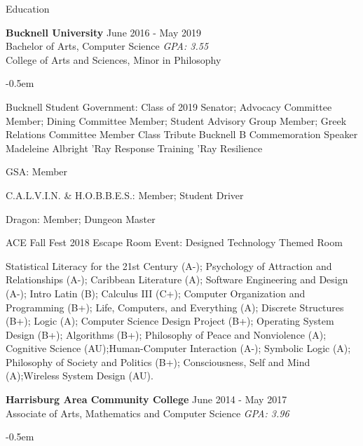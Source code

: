\documentclass{resume} %
\begin{document}

\begin{rSection}{Education}

{\bf Bucknell University} {June 2016 - May 2019} 
\\ Bachelor of Arts, Computer Science  {\em GPA: 3.55}
\\ College of Arts and Sciences, Minor in Philosophy 
\begin{rSubSection}{}{
   \itemsep -0.5em \vspace{-0.5em} %
 
    \item {Bucknell Student Government:} Class of 2019 Senator; Advocacy Committee Member; Dining Committee Member; Student Advisory Group Member; Greek Relations Committee Member
    \subitem Class Tribute Bucknell B 
    \subitem Commemoration Speaker Madeleine Albright
    \subitem 'Ray Response Training
    \subitem 'Ray Resilience
    \item {GSA:} Member
    \item {C.A.L.V.I.N. \& H.O.B.B.E.S.:} Member; Student Driver
    \item {Dragon:} Member; Dungeon Master
    \item {ACE} 
    \subitem Fall Fest 2018
     Escape Room Event: Designed Technology Themed Room}
    
  \end{rSubSection}
Statistical Literacy for the 21st Century (A-); Psychology of Attraction and Relationships (A-); Caribbean Literature (A); Software Engineering and Design (A-); Intro Latin (B); Calculus III (C+); Computer Organization and Programming (B+); Life, Computers, and Everything (A); Discrete Structures (B+); Logic (A); Computer Science Design Project (B+); Operating System Design (B+); Algorithms (B+); Philosophy of Peace and Nonviolence (A); Cognitive Science (AU);Human-Computer Interaction (A-); Symbolic Logic (A); Philosophy of Society and Politics (B+); Consciousness, Self and Mind (A);Wireless System Design (AU).


{\bf Harrisburg Area Community College} {June 2014 - May 2017} 
\\ Associate of Arts, Mathematics and Computer Science {\em GPA: 3.96}
\begin{rSubSection}{}{
   \itemsep -0.5em \vspace{-0.5em} %
   
}
\end{rSubSection}
\end{rSection}
\end{document}
